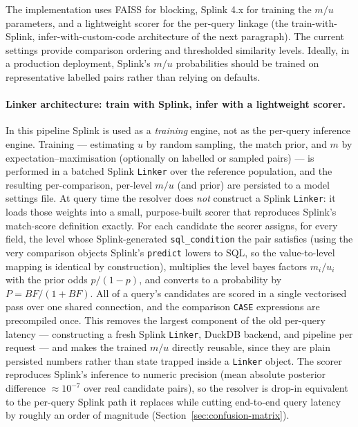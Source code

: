 \documentclass[11pt]{article}
\begin{document}
The implementation uses FAISS for blocking, Splink 4.x for training the $m/u$ parameters, and a lightweight scorer for the per-query linkage (the train-with-Splink, infer-with-custom-code architecture of the next paragraph). The current settings provide comparison ordering and thresholded similarity levels. Ideally, in a production deployment, Splink's $m/u$ probabilities should be trained on representative labelled pairs rather than relying on defaults.

\paragraph{Linker architecture: train with Splink, infer with a lightweight scorer.} In this pipeline Splink is used as a \emph{training} engine, not as the per-query inference engine. Training --- estimating $u$ by random sampling, the match prior, and $m$ by expectation--maximisation (optionally on labelled or sampled pairs) --- is performed in a batched Splink \texttt{Linker} over the reference population, and the resulting per-comparison, per-level $m/u$ (and prior) are persisted to a model settings file. At query time the resolver does \emph{not} construct a Splink \texttt{Linker}: it loads those weights into a small, purpose-built scorer that reproduces Splink's match-score definition exactly. For each candidate the scorer assigns, for every field, the level whose Splink-generated \texttt{sql\_condition} the pair satisfies (using the very comparison objects Splink's \texttt{predict} lowers to SQL, so the value-to-level mapping is identical by construction), multiplies the level bayes factors $m_i/u_i$ with the prior odds $p/(1-p)$, and converts to a probability by $P = BF/(1+BF)$. All of a query's candidates are scored in a single vectorised pass over one shared connection, and the comparison \texttt{CASE} expressions are precompiled once. This removes the largest component of the old per-query latency --- constructing a fresh Splink \texttt{Linker}, DuckDB backend, and pipeline per request --- and makes the trained $m/u$ directly reusable, since they are plain persisted numbers rather than state trapped inside a \texttt{Linker} object. The scorer reproduces Splink's inference to numeric precision (mean absolute posterior difference $\approx 10^{-7}$ over real candidate pairs), so the resolver is drop-in equivalent to the per-query Splink path it replaces while cutting end-to-end query latency by roughly an order of magnitude (Section~\ref{sec:confusion-matrix}).
\end{document}
